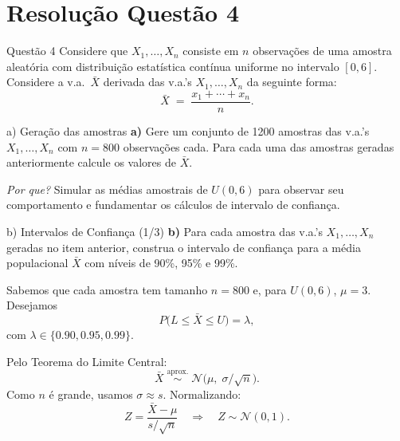 \section{Resolução Questão 4}

\begin{frame}{Questão 4}
Considere que $X_1,\dots,X_n$ consiste em $n$ observações de uma amostra aleatória com distribuição estatística contínua uniforme no intervalo $[0,6]$. Considere a v.a.\ $\bar X$ derivada das v.a.’s $X_1,\dots,X_n$ da seguinte forma:
\[
\bar X \;=\;\frac{x_1 + \cdots + x_n}{n}.
\]
\end{frame}

\begin{frame}[fragile]{a) Geração das amostras}
\textbf{a)} Gere um conjunto de 1200 amostras das v.a.’s $X_1,\dots,X_n$ com $n=800$ observações cada. Para cada uma das amostras geradas anteriormente calcule os valores de  $\bar X$.

\vspace{0.5em}
\textit{Por que?} Simular as médias amostrais de $U(0,6)$ para observar seu comportamento e fundamentar os cálculos de intervalo de confiança.

\vspace{0.5em}

\end{frame}

\begin{frame}{b) Intervalos de Confiança (1/3)}
\textbf{b)} Para cada amostra das v.a.’s $X_1,\dots,X_n$ geradas no item anterior, construa o intervalo de confiança para a média populacional $\bar X$ com níveis de 90\%, 95\% e 99\%.

\vspace{0.5em}
Sabemos que cada amostra tem tamanho $n=800$ e, para $U(0,6)$, $\mu=3$. Desejamos
\[
P\bigl(L \le \bar X \le U\bigr) = \lambda,
\]
com $\lambda\in\{0.90,0.95,0.99\}$.

\vspace{0.7em}
Pelo Teorema do Limite Central:
\[
\bar X \;\overset{\text{aprox.}}{\sim}\;\mathcal N\!\bigl(\mu,\;\sigma/\sqrt{n}\bigr).
\]
Como $n$ é grande, usamos $\sigma\approx s$. Normalizando:
\[
Z = \frac{\bar X - \mu}{s/\sqrt{n}}
\quad\Longrightarrow\quad
Z \sim \mathcal N(0,1).
\]
\end{frame}

